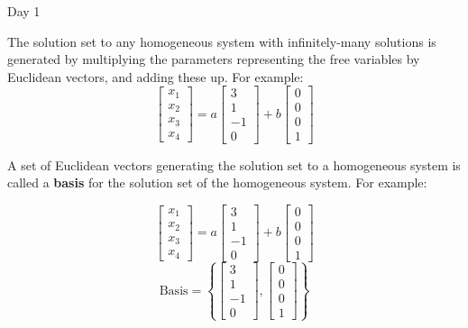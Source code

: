 \begin{applicationActivities}{Day 1}
\begin{fact}
  The solution set to any homogeneous system with infinitely-many solutions
  is generated by multiplying the parameters representing the free variables
  by Euclidean vectors, and adding these up. For example:
  \[
    \begin{bmatrix}
      x_1 \\
      x_2 \\
      x_3 \\
      x_4
    \end{bmatrix}=
    a\begin{bmatrix}
      3 \\
      1 \\
      -1 \\
      0
    \end{bmatrix}+
    b\begin{bmatrix}
      0 \\
      0 \\
      0 \\
      1
    \end{bmatrix}
  \]
\end{fact}

\begin{definition}
  A set of Euclidean vectors generating the solution set to a homogeneous
  system is called a \textbf{basis} for the solution
  set of the homogeneous system. For example:
  \begin{multicols}{2}\noindent
  \[
    \begin{bmatrix}
      x_1 \\
      x_2 \\
      x_3 \\
      x_4
    \end{bmatrix}=
    a\begin{bmatrix}
      3 \\
      1 \\
      -1 \\
      0
    \end{bmatrix}+
    b\begin{bmatrix}
      0 \\
      0 \\
      0 \\
      1
    \end{bmatrix}
  \]
  \[
    \textrm{Basis}=\left\{
    \begin{bmatrix}
      3 \\
      1 \\
      -1 \\
      0
    \end{bmatrix},
    \begin{bmatrix}
      0 \\
      0 \\
      0 \\
      1
    \end{bmatrix}\right\}
  \]
  \end{multicols}
\end{definition}


\end{applicationActivities}
